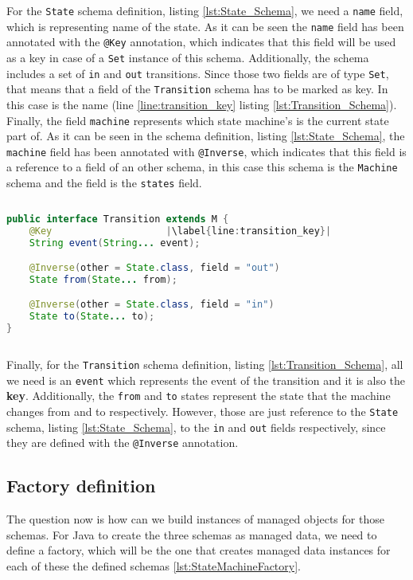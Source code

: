 For the \texttt{State} schema definition, listing \ref{lst:State_Schema}, we need a \texttt{name} field, which is representing name of the state. 
As it can be seen the \texttt{name} field has been annotated with the \texttt{@Key} annotation, which indicates that this field will be used as a key in case of a \texttt{Set} instance of this schema.
Additionally, the schema includes a set of \texttt{in} and \texttt{out} transitions.
Since those two fields are of type \texttt{Set}, that means that a field of the \texttt{Transition} schema has to be marked as key.
In this case is the name (line \ref{line:transition_key} listing \ref{lst:Transition_Schema}).
Finally, the field \texttt{machine} represents which state machine's is the current state part of. 
As it can be seen in the schema definition, listing \ref{lst:State_Schema}, the \texttt{machine} field has been annotated with \texttt{@Inverse}, which indicates that this field is a reference to a field of an other schema, in this case this schema is the \texttt{Machine} schema and the field is the \texttt{states} field.

\begin{sourcecode}[H]
	\begin{lstlisting}[language=Java,escapechar=|]
public interface Transition extends M {
	@Key 					|\label{line:transition_key}| 
	String event(String... event);

	@Inverse(other = State.class, field = "out")
	State from(State... from);

	@Inverse(other = State.class, field = "in")
	State to(State... to);
}
	\end{lstlisting}
	\caption{The Transition Schema}
	\label{lst:Transition_Schema}
\end{sourcecode}

Finally, for the \texttt{Transition} schema definition, listing \ref{lst:Transition_Schema}, all we need is an \texttt{event} which represents the event of the transition and it is also the \textbf{key}.
Additionally, the \texttt{from} and \texttt{to} states represent the state that the machine changes from and to respectively.
However, those are just reference to the \texttt{State} schema, listing \ref{lst:State_Schema}, to the \texttt{in} and \texttt{out} fields respectively, since they are defined with the \texttt{@Inverse} annotation.

\subsection{Factory definition}
The question now is how can we build instances of managed objects for those schemas. For Java to create the three schemas as managed data, we need to define a factory, which will be the one that creates managed data instances for each of these the defined schemas \ref{lst:StateMachineFactory}.


